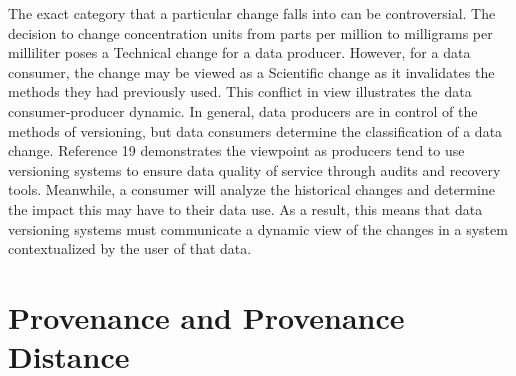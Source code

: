 The exact category that a particular change falls into can be controversial.
The decision to change concentration units from parts per million to milligrams per milliliter poses a Technical change for a data producer.
However, for a data consumer, the change may be viewed as a Scientific change as it invalidates the methods they had previously used.
This conflict in view illustrates the data consumer-producer dynamic.
In general, data producers are in control of the methods of versioning, but data consumers determine the classification of a data change.
Reference 19 demonstrates the viewpoint as producers tend to use versioning systems to ensure data quality of service through audits and recovery tools.
Meanwhile, a consumer will analyze the historical changes and determine the impact this may have to their data use.
As a result, this means that data versioning systems must communicate a dynamic view of the changes in a system contextualized by the user of that data.

\section{Provenance and Provenance Distance}

